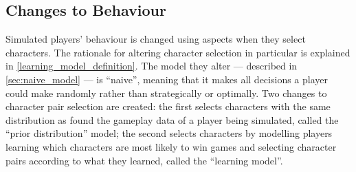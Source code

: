 \subsection{Changes to Behaviour}
\label{early_behaviour_change_descriptions}

Simulated players' behaviour is changed using aspects when they select
characters. The rationale for altering character selection in particular is
explained in \cref{learning_model_definition}. The model they alter ---
described in \cref{sec:naive_model} --- is ``naive'', meaning that it makes all
decisions a player could make randomly rather than strategically or optimally.
Two changes to character pair selection are created: the first selects
characters with the same distribution as found the gameplay data of a player
being simulated, called the ``prior distribution'' model; the second selects
characters by modelling players learning which characters are most likely to win
games and selecting character pairs according to what they learned, called the
``learning model''.

